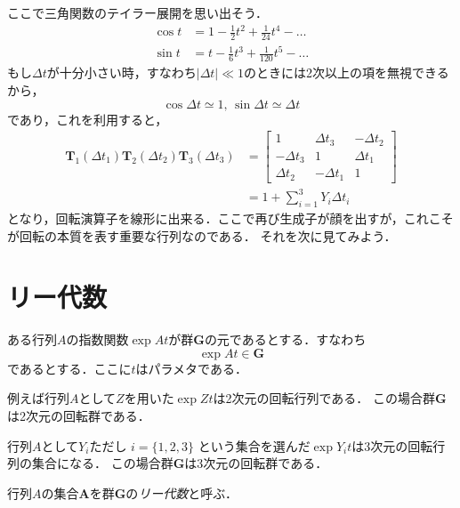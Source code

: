 \documentclass{jsbook}
\newcommand{\keyword}[1]{\emph{#1}}
\newcommand{\bop}[1]{\boldsymbol{#1}}
\newcommand{\bg}[1]{\mathbf{#1}}
\newcommand{\verysmall}{\varDelta}
\begin{document}
ここで三角関数のテイラー展開を思い出そう．
\begin{align}
\cos t&=1-\frac{1}{2}t^2+\frac{1}{24}t^4-\dots\\
\sin t&=t-\frac{1}{6}t^3+\frac{1}{120}t^5-\dots
\end{align}
もし$\verysmall t$が十分小さい時，すなわち$|\verysmall t|\ll1$のときには2次以上の項を無視できるから，
\begin{equation}
\cos\verysmall t\simeq1,\,
\sin\verysmall t\simeq\verysmall t
\end{equation}
であり，これを利用すると，
\begin{align}
\bop{T}_1(\verysmall t_1)\bop{T}_2(\verysmall t_2)\bop{T}_3(\verysmall t_3)
  &=\begin{bmatrix}1&\verysmall t_3&-\verysmall t_2\\
    -\verysmall t_3&1&\verysmall t_1\\
    \verysmall t_2&-\verysmall t_1&1\end{bmatrix}\\
  &=1+\sum_{i=1}^3Y_i\verysmall t_i
\end{align}
となり，回転演算子を線形に出来る．ここで再び生成子が顔を出すが，これこそが回転の本質を表す重要な行列なのである．
それを次に見てみよう．

\section{リー代数}

ある行列$A$の指数関数$\exp At$が群$\bg{G}$の元であるとする．すなわち
\begin{equation}
\exp At\in\bg{G}
\end{equation}
であるとする．ここに$t$はパラメタである．

例えば行列$A$として$Z$を用いた$\exp Zt$は2次元の回転行列である．
この場合群$\bg{G}$は2次元の回転群である．

行列$A$として$Y_i$ただし $i=\{1,2,3\}$ という集合を選んだ$\exp Y_it$は3次元の回転行列の集合になる．
この場合群$\bg{G}$は3次元の回転群である．

行列$A$の集合$\bg{A}$を群$\bg{G}$の\keyword{リー代数}と呼ぶ．
\end{document}
